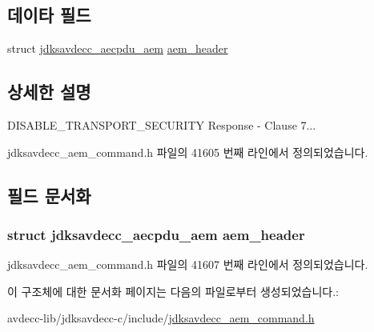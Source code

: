 \subsection*{데이타 필드}
\begin{DoxyCompactItemize}
\item 
struct \hyperlink{structjdksavdecc__aecpdu__aem}{jdksavdecc\+\_\+aecpdu\+\_\+aem} \hyperlink{structjdksavdecc__aem__command__disable__transport__security__response_ae1e77ccb75ff5021ad923221eab38294}{aem\+\_\+header}
\end{DoxyCompactItemize}


\subsection{상세한 설명}
D\+I\+S\+A\+B\+L\+E\+\_\+\+T\+R\+A\+N\+S\+P\+O\+R\+T\+\_\+\+S\+E\+C\+U\+R\+I\+TY Response -\/ Clause 7... 

jdksavdecc\+\_\+aem\+\_\+command.\+h 파일의 41605 번째 라인에서 정의되었습니다.



\subsection{필드 문서화}
\subsubsection[{\texorpdfstring{aem\+\_\+header}{aem_header}}]{\setlength{\rightskip}{0pt plus 5cm}struct {\bf jdksavdecc\+\_\+aecpdu\+\_\+aem} aem\+\_\+header}\hypertarget{structjdksavdecc__aem__command__disable__transport__security__response_ae1e77ccb75ff5021ad923221eab38294}{}\label{structjdksavdecc__aem__command__disable__transport__security__response_ae1e77ccb75ff5021ad923221eab38294}


jdksavdecc\+\_\+aem\+\_\+command.\+h 파일의 41607 번째 라인에서 정의되었습니다.



이 구조체에 대한 문서화 페이지는 다음의 파일로부터 생성되었습니다.\+:\begin{DoxyCompactItemize}
\item 
avdecc-\/lib/jdksavdecc-\/c/include/\hyperlink{jdksavdecc__aem__command_8h}{jdksavdecc\+\_\+aem\+\_\+command.\+h}\end{DoxyCompactItemize}
